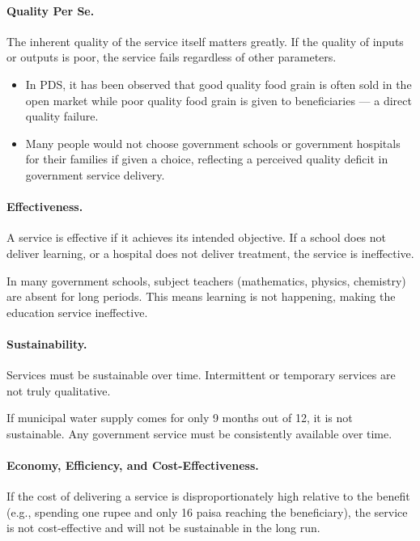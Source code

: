 \paragraph{Quality Per Se.} The inherent quality of the service itself matters greatly. If the quality of inputs or outputs is poor, the service fails regardless of other parameters.

\begin{ExampleBox}
\begin{itemize}
\item In PDS, it has been observed that good quality food grain is often sold in the open market while poor quality food grain is given to beneficiaries --- a direct quality failure.
\item Many people would not choose government schools or government hospitals for their families if given a choice, reflecting a perceived quality deficit in government service delivery.
\end{itemize}
\end{ExampleBox}

\paragraph{Effectiveness.} A service is effective if it achieves its intended objective. If a school does not deliver learning, or a hospital does not deliver treatment, the service is ineffective.

\begin{ExampleBox}
In many government schools, subject teachers (mathematics, physics, chemistry) are absent for long periods. This means learning is not happening, making the education service ineffective.
\end{ExampleBox}

\paragraph{Sustainability.} Services must be sustainable over time. Intermittent or temporary services are not truly qualitative.

\begin{ExampleBox}
If municipal water supply comes for only 9 months out of 12, it is not sustainable. Any government service must be consistently available over time.
\end{ExampleBox}

\paragraph{Economy, Efficiency, and Cost-Effectiveness.} If the cost of delivering a service is disproportionately high relative to the benefit (e.g., spending one rupee and only 16 paisa reaching the beneficiary), the service is not cost-effective and will not be sustainable in the long run.

